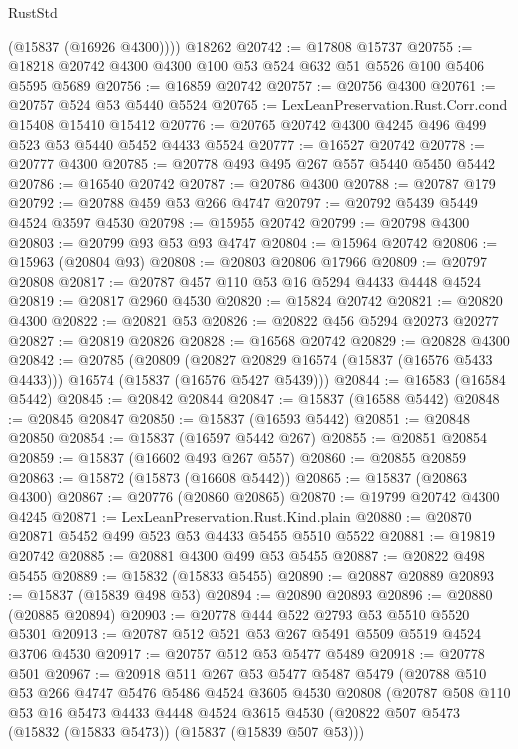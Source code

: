 \begin{lexlean}{RustStd}
\begin{coremodule}
        (@15837 (@16926 @4300))))
    @18262
@20742 := @17808 @15737
@20755 := @18218 @20742 @4300 @4300 @100 @53 @524 @632 @51 @5526 @100 @5406 @5595 @5689
@20756 := @16859 @20742
@20757 := @20756 @4300
@20761 := @20757 @524 @53 @5440 @5524
@20765 := LexLeanPreservation.Rust.Corr.cond @15408 @15410 @15412
@20776 := @20765 @20742 @4300 @4245 @496 @499 @523 @53 @5440 @5452 @4433 @5524
@20777 := @16527 @20742
@20778 := @20777 @4300
@20785 := @20778 @493 @495 @267 @557 @5440 @5450 @5442
@20786 := @16540 @20742
@20787 := @20786 @4300
@20788 := @20787 @179
@20792 := @20788 @459 @53 @266 @4747
@20797 := @20792 @5439 @5449 @4524 @3597 @4530
@20798 := @15955 @20742
@20799 := @20798 @4300
@20803 := @20799 @93 @53 @93 @4747
@20804 := @15964 @20742
@20806 := @15963 (@20804 @93)
@20808 := @20803 @20806 @17966
@20809 := @20797 @20808
@20817 := @20787 @457 @110 @53 @16 @5294 @4433 @4448 @4524
@20819 := @20817 @2960 @4530
@20820 := @15824 @20742
@20821 := @20820 @4300
@20822 := @20821 @53
@20826 := @20822 @456 @5294 @20273 @20277
@20827 := @20819 @20826
@20828 := @16568 @20742
@20829 := @20828 @4300
@20842 := @20785
    (@20809
      (@20827 @20829 @16574 (@15837 (@16576 @5433 @4433)))
      @16574
      (@15837 (@16576 @5427 @5439)))
@20844 := @16583 (@16584 @5442)
@20845 := @20842 @20844
@20847 := @15837 (@16588 @5442)
@20848 := @20845 @20847
@20850 := @15837 (@16593 @5442)
@20851 := @20848 @20850
@20854 := @15837 (@16597 @5442 @267)
@20855 := @20851 @20854
@20859 := @15837 (@16602 @493 @267 @557)
@20860 := @20855 @20859
@20863 := @15872 (@15873 (@16608 @5442))
@20865 := @15837 (@20863 @4300)
@20867 := @20776 (@20860 @20865)
@20870 := @19799 @20742 @4300 @4245
@20871 := LexLeanPreservation.Rust.Kind.plain
@20880 := @20870 @20871 @5452 @499 @523 @53 @4433 @5455 @5510 @5522
@20881 := @19819 @20742
@20885 := @20881 @4300 @499 @53 @5455
@20887 := @20822 @498 @5455
@20889 := @15832 (@15833 @5455)
@20890 := @20887 @20889
@20893 := @15837 (@15839 @498 @53)
@20894 := @20890 @20893
@20896 := @20880 (@20885 @20894)
@20903 := @20778 @444 @522 @2793 @53 @5510 @5520 @5301
@20913 := @20787 @512 @521 @53 @267 @5491 @5509 @5519 @4524 @3706 @4530
@20917 := @20757 @512 @53 @5477 @5489
@20918 := @20778 @501
@20967 := @20918
    @511
    @267
    @53
    @5477
    @5487
    @5479
    (@20788
      @510
      @53
      @266
      @4747
      @5476
      @5486
      @4524
      @3605
      @4530
      @20808
      (@20787
        @508
        @110
        @53
        @16
        @5473
        @4433
        @4448
        @4524
        @3615
        @4530
        (@20822 @507 @5473 (@15832 (@15833 @5473)) (@15837 (@15839 @507 @53)))

\end{coremodule}
\end{lexlean}
